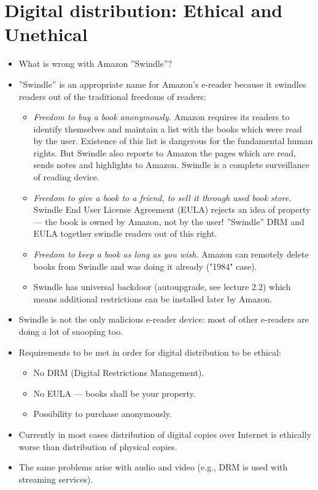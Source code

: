 \documentclass[twoside,openright]{report}
\newcommand{\addnom}[2]{\nomenclature{#1}{#2}}
\begin{document}
\section{Digital distribution: Ethical and Unethical}
\begin{itemize}
 \item     What is wrong with Amazon ''Swindle''?
 \item     ''Swindle'' is an appropriate name for Amazon's e-reader because it swindles readers out of the traditional freedoms of readers:
\begin{itemize}
 \item         \emph{Freedom to buy a book anonymously.} Amazon requires its readers to identify themselves and maintain a list with the books which were read by the user. Existence of this list is dangerous for the fundamental human rights. But Swindle also reports to Amazon the pages which are read, sends notes and highlights to Amazon. Swindle is a complete surveillance of reading device.
 \item         \emph{Freedom to give a book to a friend, to sell it through used book store.} Swindle End User License Agreement (EULA) rejects an idea of property --- the book is owned by Amazon, not by the user! ''Swindle'' DRM and EULA together swindle readers out of this right.
 \item         \emph{Freedom to keep a book as long as you wish.} Amazon can remotely delete books from Swindle and was doing it already ("1984" case).
 \item         Swindle has universal backdoor (autoupgrade, see lecture 2.2) which means additional restrictions can be installed later by Amazon.
\end{itemize}
 \item     Swindle is not the only malicious e-reader device: most of other e-readers are doing a lot of snooping too.
 \item     Requirements to be met in order for digital distribution to be ethical:
\begin{itemize}
 \item         No DRM (Digital Restrictions Management).
 \item         No EULA --- books shall be your property.
\addnom{EULA}{End-User License Agreement }
 \item         Possibility to purchase anonymously.
\end{itemize}
 \item     Currently in most cases distribution of digital copies over Internet is ethically worse than distribution of physical copies.
 \item     The same problems arise with audio and video (e.g., DRM is used with streaming services).
\end{itemize}
\end{document}
